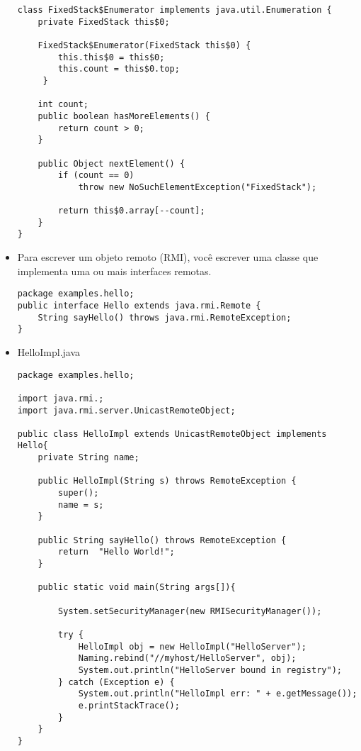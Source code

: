 \begin{itemize}
\begin{lstlisting}
class FixedStack$Enumerator implements java.util.Enumeration {
	private FixedStack this$0;
	
	FixedStack$Enumerator(FixedStack this$0) {
		this.this$0 = this$0;
		this.count = this$0.top;
	 }
			
	int count;
	public boolean hasMoreElements() {
		return count > 0;
	}
		
	public Object nextElement() {
		if (count == 0)
			throw new NoSuchElementException("FixedStack");
		
		return this$0.array[--count];
	}
}
\end{lstlisting}
			
			\clearpage
			\item Para escrever um objeto remoto (RMI), você escrever uma classe que implementa uma ou mais interfaces remotas. 
			
\begin{lstlisting}
package examples.hello;
public interface Hello extends java.rmi.Remote {
	String sayHello() throws java.rmi.RemoteException;
}
\end{lstlisting}
	 
\item HelloImpl.java
\begin{lstlisting}
package examples.hello;

import java.rmi.;
import java.rmi.server.UnicastRemoteObject;

public class HelloImpl extends UnicastRemoteObject implements Hello{
	private String name;
	
	public HelloImpl(String s) throws RemoteException {
		super();
		name = s;
	}
	
	public String sayHello() throws RemoteException {
		return  "Hello World!";
	}
	
	public static void main(String args[]){
	
		System.setSecurityManager(new RMISecurityManager());
	
		try {
			HelloImpl obj = new HelloImpl("HelloServer");
			Naming.rebind("//myhost/HelloServer", obj);
			System.out.println("HelloServer bound in registry");
		} catch (Exception e) {
			System.out.println("HelloImpl err: " + e.getMessage());
			e.printStackTrace();
		}
	}
}
\end{lstlisting}
		\end{itemize}


	\clearpage
